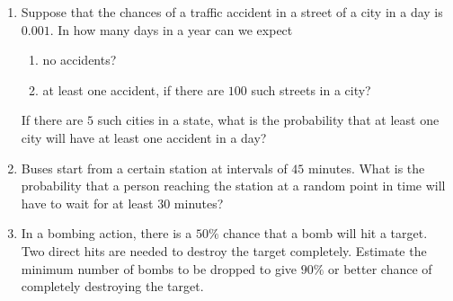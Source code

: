 \documentclass[svgnames]{amsart}
\begin{document}
\begin{enumerate}[leftmargin=*]
\item Suppose that the chances of a traffic accident in a street of a city in a day is $0.001$. In how many days in a year can we expect
\begin{enumerate}
    \item no accidents?
    \item at least one accident, if there are $100$ such streets in a city?
\end{enumerate}
If there are $5$ such cities in a state, what is the probability that at least one city will have at least one accident in a day?

\item Buses start from a certain station at intervals of $45$ minutes. What is the probability that a person reaching the station at a random point in time will have to wait for at least $30$ minutes?

\item In a bombing action, there is a $50\%$ chance that a bomb will hit a target. Two direct hits are needed to destroy the target completely. Estimate the minimum number of bombs to be dropped to give $90\%$ or better chance of completely destroying the target.
\end{enumerate}
\end{document}
